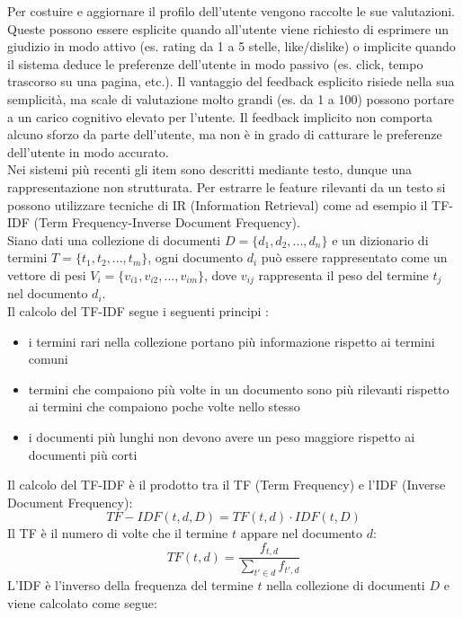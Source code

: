 \noindent Per costuire e aggiornare il profilo dell'utente vengono raccolte le sue valutazioni. Queste possono essere esplicite quando all'utente viene richiesto di esprimere un giudizio in modo attivo (es. rating da 1 a 5 stelle, like/dislike) o implicite quando il sistema deduce le preferenze dell'utente in modo passivo (es. click, tempo trascorso su una pagina, etc.). Il vantaggio del feedback esplicito risiede nella sua semplicità, ma scale di valutazione molto grandi (es. da 1 a 100) possono portare a un carico cognitivo elevato per l'utente. Il feedback implicito non comporta alcuno sforzo da parte dell'utente, ma non è in grado di catturare le preferenze dell'utente in modo accurato.\cite{Lops2011}\\
Nei sistemi più recenti gli item sono descritti mediante testo, dunque una rappresentazione non strutturata. Per estrarre le feature rilevanti da un testo si possono utilizzare tecniche di IR (Information Retrieval) come ad esempio il TF-IDF (Term Frequency-Inverse Document Frequency).\\
Siano dati una collezione di documenti $D = \{d_1, d_2, ..., d_n\}$ e un dizionario di termini $T = \{t_1, t_2, ..., t_m\}$, ogni documento $d_i$ può essere rappresentato come un vettore di pesi $V_i = \{v_{i1}, v_{i2}, ..., v_{im}\}$, dove $v_{ij}$ rappresenta il peso del termine $t_j$ nel documento $d_i$.\\
Il calcolo del TF-IDF segue i seguenti principi \cite{TFIDF}:
\begin{itemize}
    \item i termini rari nella collezione portano più informazione rispetto ai termini comuni
    \item termini che compaiono più volte in un documento sono più rilevanti rispetto ai termini che compaiono poche volte nello stesso
    \item i documenti più lunghi non devono avere un peso maggiore rispetto ai documenti più corti
\end{itemize}
Il calcolo del TF-IDF è il prodotto tra il TF (Term Frequency) e l'IDF (Inverse Document Frequency):
\begin{equation}
    TF-IDF(t,d,D) = TF(t,d) \cdot IDF(t,D)
\end{equation}
Il TF è il numero di volte che il termine $t$ appare nel documento $d$:
\begin{equation}
    TF(t,d) = \frac{f_{t,d}}{\sum_{t' \in d} f_{t',d}}
\end{equation}
L'IDF è l'inverso della frequenza del termine $t$ nella collezione di documenti $D$ e viene calcolato come segue:
